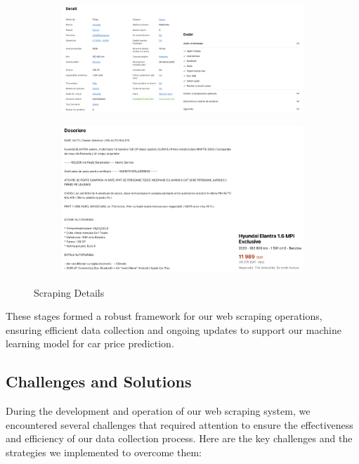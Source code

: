 \begin{figure}
    \centering
    \begin{subfigure}{\linewidth}
        \centering
        \includegraphics[width=\linewidth]{images/priceprediction/data/Screenshot 2024-05-28 at 21.33.53.png}
    \end{subfigure}
    \hfill
    \begin{subfigure}{\linewidth}
        \centering
        \includegraphics[width=\linewidth]{images/priceprediction/data/Screenshot 2024-05-28 at 21.39.39.png}
    \end{subfigure}
    \caption{Scraping Details}
    \label{fig:scraping-details}
\end{figure}

These stages formed a robust framework for our web scraping operations, ensuring efficient data collection and ongoing updates to support our machine learning model for car price prediction.

\subsection{Challenges and Solutions}
During the development and operation of our web scraping system, we encountered several challenges that required attention to ensure the effectiveness and efficiency of our data collection process. Here are the key challenges and the strategies we implemented to overcome them:

